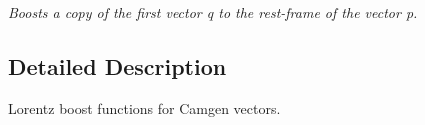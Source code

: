 \begin{DoxyCompactItemize}
\begin{DoxyCompactList}\small\item\em Boosts a copy of the first vector q to the rest-\/frame of the vector p. \end{DoxyCompactList}\end{DoxyCompactItemize}


\subsection{Detailed Description}
Lorentz boost functions for Camgen vectors. 